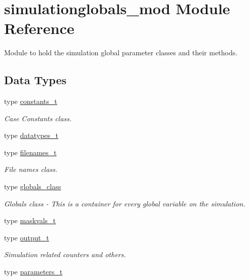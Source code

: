 \hypertarget{namespacesimulationglobals__mod}{}\section{simulationglobals\+\_\+mod Module Reference}
\label{namespacesimulationglobals__mod}


Module to hold the simulation global parameter classes and their methods.  


\subsection*{Data Types}
\begin{DoxyCompactItemize}
\item 
type \mbox{\hyperlink{structsimulationglobals__mod_1_1constants__t}{constants\+\_\+t}}
\begin{DoxyCompactList}\small\item\em Case Constants class. \end{DoxyCompactList}\item 
type \mbox{\hyperlink{structsimulationglobals__mod_1_1datatypes__t}{datatypes\+\_\+t}}
\item 
type \mbox{\hyperlink{structsimulationglobals__mod_1_1filenames__t}{filenames\+\_\+t}}
\begin{DoxyCompactList}\small\item\em File names class. \end{DoxyCompactList}\item 
type \mbox{\hyperlink{structsimulationglobals__mod_1_1globals__class}{globals\+\_\+class}}
\begin{DoxyCompactList}\small\item\em Globals class -\/ This is a container for every global variable on the simulation. \end{DoxyCompactList}\item 
type \mbox{\hyperlink{structsimulationglobals__mod_1_1maskvals__t}{maskvals\+\_\+t}}
\item 
type \mbox{\hyperlink{structsimulationglobals__mod_1_1output__t}{output\+\_\+t}}
\begin{DoxyCompactList}\small\item\em Simulation related counters and others. \end{DoxyCompactList}\item 
type \mbox{\hyperlink{structsimulationglobals__mod_1_1parameters__t}{parameters\+\_\+t}}
\item 

\end{DoxyCompactItemize}
